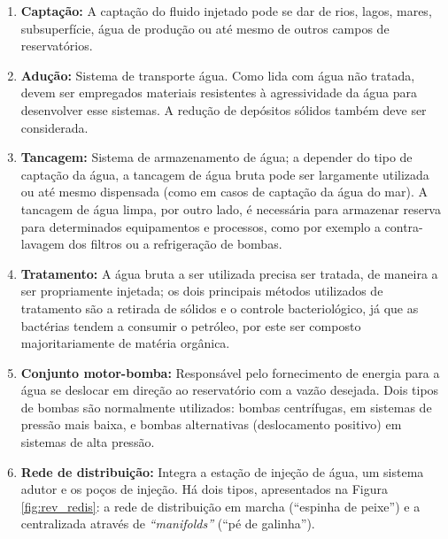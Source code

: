 \begin{enumerate}
\item \textbf{Capta\c{c}\~{a}o:} A capta\c{c}\~{a}o do fluido injetado pode se dar de rios, lagos, mares, subsuperf\'{i}cie, \'{a}gua de produ\c{c}\~{a}o ou at\'{e} mesmo de outros campos de reservat\'{o}rios.

\item \textbf{Adu\c{c}\~{a}o:} Sistema de transporte \'{a}gua. Como lida com \'{a}gua n\~{a}o tratada, devem ser empregados materiais resistentes \`{a} agressividade da \'{a}gua para desenvolver esse sistemas. A redu\c{c}\~{a}o de dep\'{o}sitos s\'{o}lidos tamb\'{e}m deve ser considerada.

\item \textbf{Tancagem:} Sistema de armazenamento de \'{a}gua; a depender do tipo de capta\c{c}\~{a}o da \'{a}gua, a tancagem de \'{a}gua bruta pode ser largamente utilizada ou at\'{e} mesmo dispensada (como em casos de capta\c{c}\~{a}o da \'{a}gua do mar). A tancagem de \'{a}gua limpa, por outro lado, \'{e} necess\'{a}ria para armazenar reserva para determinados equipamentos e processos, como por exemplo a contra-lavagem dos filtros ou a refrigera\c{c}\~{a}o de bombas.

\item \textbf{Tratamento:} A \'{a}gua bruta a ser utilizada precisa ser tratada, de maneira a ser propriamente injetada; os dois principais m\'{e}todos utilizados de tratamento s\~{a}o a retirada de s\'{o}lidos e o controle bacteriol\'{o}gico, j\'{a} que as bact\'{e}rias tendem a consumir o petr\'{o}leo, por este ser composto majoritariamente de mat\'{e}ria org\^{a}nica.

\item \textbf{Conjunto motor-bomba:} Respons\'{a}vel pelo fornecimento de energia para a \'{a}gua se deslocar em dire\c{c}\~{a}o ao reservat\'{o}rio com a vaz\~{a}o desejada. Dois tipos de bombas s\~{a}o normalmente utilizados: bombas centr\'{i}fugas, em sistemas de press\~{a}o mais baixa, e bombas alternativas (deslocamento positivo) em sistemas de alta press\~{a}o.

\item \textbf{Rede de distribui\c{c}\~{a}o:} Integra a esta\c{c}\~{a}o de inje\c{c}\~{a}o de \'{a}gua, um sistema adutor e os po\c{c}os de inje\c{c}\~{a}o. H\'{a} dois tipos, apresentados na Figura \ref{fig:rev_redis}: a rede de distribui\c{c}\~{a}o em marcha (``espinha de peixe'') e a centralizada atrav\'{e}s de \textit{``manifolds''} (``p\'{e} de galinha'').


\end{enumerate}
